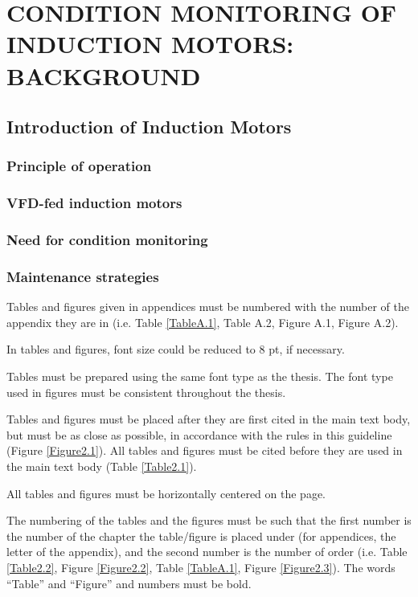 \chapter{CONDITION MONITORING OF INDUCTION MOTORS: BACKGROUND }\label{Ch2}
\vspace*{-12pt} %
\section{Introduction of Induction Motors}

\subsection{Principle of operation}
\subsection{VFD-fed induction motors}
\subsection{Need for condition monitoring}
\subsection{Maintenance strategies}

Tables and figures given in appendices must be numbered with the number of the appendix they are in (i.e. Table \ref{TableA.1}, Table A.2, Figure A.1, Figure A.2).

In tables and figures, font size could be reduced to 8 pt, if necessary.

Tables must be prepared using the same font type as the thesis. The font type used in figures must be consistent throughout the thesis.

Tables and figures must be placed after they are first cited in the main text body, but must be as close as possible, in accordance with the rules in this guideline (Figure \ref{Figure2.1}). All tables and figures must be cited before they are used in the main text body (Table \ref{Table2.1}).

All tables and figures must be horizontally centered on the page.

The numbering of the tables and the figures must be such that the first number is the number of the chapter the table/figure is placed under (for appendices, the letter of the appendix), and the second number is the number of order (i.e. Table \ref{Table2.2}, Figure \ref{Figure2.2}, Table \ref{TableA.1}, Figure \ref{Figure2.3}). The words “Table” and “Figure” and numbers must be bold.

